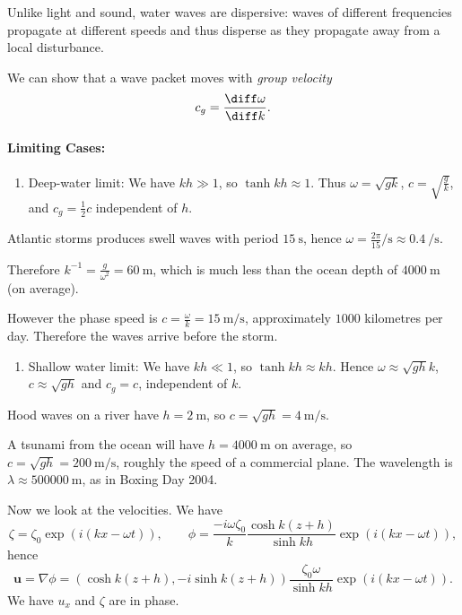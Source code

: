 \documentclass[12pt]{article}
\begin{document}
Unlike light and sound, water waves are dispersive: waves of different frequencies propagate at different speeds and thus disperse as they propagate away from a local disturbance.

We can show that a wave packet moves with \emph{group velocity}
\[
c_g = \frac{\diff \omega}{\diff k}.
\]

\paragraph{Limiting Cases:} %

\begin{enumerate}
	\item Deep-water limit: We have $kh \gg 1$, so  $\tanh kh \approx 1$. Thus  $\omega = \sqrt{gk}$, $c = \sqrt{ \frac{g}{k}}$, and $c_g = \frac{1}{2} c$ independent of $h$.
\end{enumerate}
\begin{exbox}
	Atlantic storms produces swell waves with period $\qty{15}{\second}$, hence $\omega = \frac{2 \pi}{15}\unit{\per \second} \approx \qty{0.4}{\per \second}$.

	Therefore $k^{-1} = \frac{g}{\omega^2} = \qty{60}{\metre}$, which is much less than the ocean depth of $\qty{4000}{\metre}$ (on average).

	However the phase speed is $c = \frac{\omega}{k} = \qty{15}{\metre \per \second}$, approximately $1000$ kilometres per day. Therefore the waves arrive before the storm.
\end{exbox}
\begin{enumerate}[resume]
	\item Shallow water limit: We have $kh \ll 1$, so $\tanh kh \approx kh$. Hence $\omega \approx \sqrt{gh} k$, $c \approx \sqrt{gh}$ and $c_g = c$, independent of $k$.
\end{enumerate}
\begin{exbox}
	Hood waves on a river have $h = \qty{2}{\metre}$, so $c = \sqrt{gh} = \qty{4}{\metre \per \second}$.

	A tsunami from the ocean will have $h = \qty{4000}{\metre}$ on average, so $c = \sqrt{gh} = \qty{200}{\metre \per \second}$, roughly the speed of a commercial plane. The wavelength is $\lambda \approx \qty{500000}{\metre}$, as in Boxing Day 2004.
\end{exbox}

Now we look at the velocities. We have
\[
\zeta = \zeta_0 \exp(i(kx - \omega t)), \qquad \phi = \frac{-i \omega \zeta_0}{k} \frac{\cosh k(z+h)}{\sinh kh} \exp(i(kx - \omega t)),
\]
hence
\[
\mathbf{u} = \nabla \phi = (\cosh k(z+h), -i \sinh k(z+h)) \frac{\zeta_0 \omega}{\sinh kh} \exp(i(kx - \omega t)).
\]
We have $u_x$ and $\zeta$ are in phase.
\end{document}
